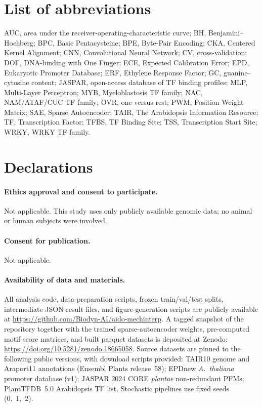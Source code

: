 \documentclass[11pt, a4paper]{article}
\begin{document}
\section*{List of abbreviations}
\noindent AUC, area under the receiver-operating-characteristic curve;
BH, Benjamini--Hochberg;
BPC, Basic Pentacysteine;
BPE, Byte-Pair Encoding;
CKA, Centered Kernel Alignment;
CNN, Convolutional Neural Network;
CV, cross-validation;
DOF, DNA-binding with One Finger;
ECE, Expected Calibration Error;
EPD, Eukaryotic Promoter Database;
ERF, Ethylene Response Factor;
GC, guanine--cytosine content;
JASPAR, open-access database of TF binding profiles;
MLP, Multi-Layer Perceptron;
MYB, Myeloblastosis TF family;
NAC, NAM/ATAF/CUC TF family;
OVR, one-versus-rest;
PWM, Position Weight Matrix;
SAE, Sparse Autoencoder;
TAIR, The Arabidopsis Information Resource;
TF, Transcription Factor;
TFBS, TF Binding Site;
TSS, Transcription Start Site;
WRKY, WRKY TF family.

\section*{Declarations}

\paragraph{Ethics approval and consent to participate.}
Not applicable. This study uses only publicly available genomic data; no
animal or human subjects were involved.

\paragraph{Consent for publication.}
Not applicable.

\paragraph{Availability of data and materials.}
All analysis code, data-preparation scripts, frozen train/val/test
splits, intermediate JSON result files, and figure-generation scripts
are publicly available at
\url{https://github.com/Biodyn-AI/aido-mechinterp}. A tagged snapshot of
the repository together with the trained sparse-autoencoder weights,
pre-computed motif-score matrices, and built parquet datasets is
deposited at Zenodo:
\url{https://doi.org/10.5281/zenodo.18665058}.
Source datasets are pinned to the following public versions, with
download scripts provided: TAIR10 genome and Araport11 annotations
(Ensembl Plants release~58); EPDnew \textit{A.~thaliana} promoter
database (v1); JASPAR 2024 CORE \textit{plantae} non-redundant PFMs;
PlantTFDB~5.0 Arabidopsis TF list. Stochastic pipelines use fixed
seeds (0,~1,~2).
\end{document}

